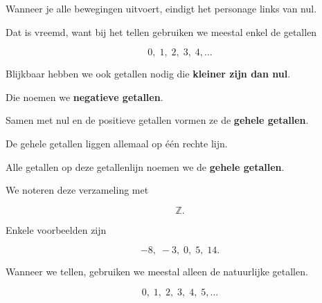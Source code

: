\documentclass{ximera}
\begin{document}
Wanneer je alle bewegingen uitvoert, eindigt het personage links van nul.

Dat is vreemd, want bij het tellen gebruiken we meestal enkel de getallen

\[
0,\;1,\;2,\;3,\;4,\ldots
\]

Blijkbaar hebben we ook getallen nodig die \textbf{kleiner zijn dan nul}.

Die noemen we \textbf{negatieve getallen}.

Samen met nul en de positieve getallen vormen ze de
\textbf{gehele getallen}.




De gehele getallen liggen allemaal op één rechte lijn.

\begin{center}
\end{center}

Alle getallen op deze getallenlijn noemen we de
\textbf{gehele getallen}.

We noteren deze verzameling met

\[
\mathbb Z.
\]

Enkele voorbeelden zijn

\[
-8,\;
-3,\;
0,\;
5,\;
14.
\]



Wanneer we tellen, gebruiken we meestal alleen de natuurlijke getallen.

\[
0,\;1,\;2,\;3,\;4,\;5,\ldots
\]
\end{document}
